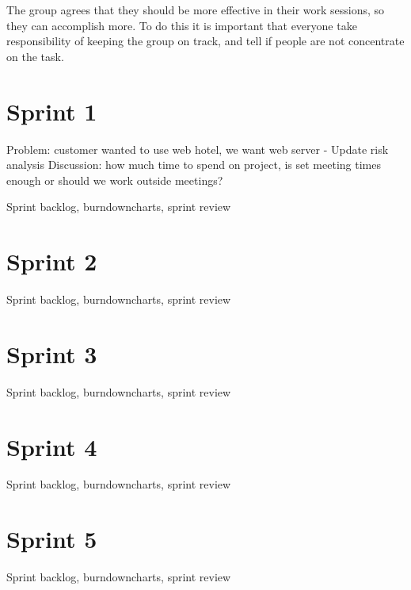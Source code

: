 The group agrees that they should be more effective in their work sessions, so they can accomplish more. To do this it is important that everyone take responsibility of keeping the group on track, and tell if people are not concentrate on the task.


\section{Sprint 1}
Problem: customer wanted to use web hotel, we want web server
- Update risk analysis
Discussion: how much time to spend on project, is set meeting times enough or should we work outside meetings?

Sprint backlog, burndowncharts, sprint review

\section{Sprint 2}
Sprint backlog, burndowncharts, sprint review

\section{Sprint 3}
Sprint backlog, burndowncharts, sprint review

\section{Sprint 4}
Sprint backlog, burndowncharts, sprint review

\section{Sprint 5}
Sprint backlog, burndowncharts, sprint review

\cleardoublepage